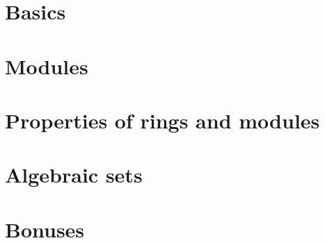 



\frontmatter



\tableofcontents

\mainmatter

\chapter{Basics}







\chapter{Modules}








\chapter{Properties of rings and modules}







\chapter{Algebraic sets}






\chapter{Bonuses}



\backmatter

\nocite{*}
\printbibliography




